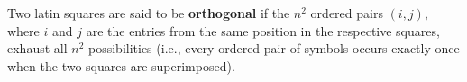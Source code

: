 Two latin squares are said to be \textbf{orthogonal} if the $n^2$ ordered pairs $(i, j)$, where $i$ and $j$ are the entries from the same position in the respective squares, exhaust all $n^2$ possibilities (i.e., every ordered pair of symbols occurs exactly once when the two squares are superimposed).
